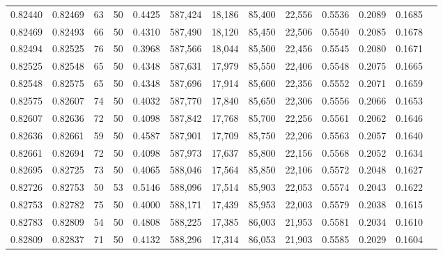 \begin{tabular}{rrrrrrrrrrrrr}
0.82440 & 0.82469 &    63 &  50 &                                     0.4425 & 587,424 &  18,186 &  85,400 &  22,556 & 0.5536 & 0.2089 & 0.1685 \\
0.82469 & 0.82493 &    66 &  50 &                                     0.4310 & 587,490 &  18,120 &  85,450 &  22,506 & 0.5540 & 0.2085 & 0.1678 \\
0.82494 & 0.82525 &    76 &  50 &                                     0.3968 & 587,566 &  18,044 &  85,500 &  22,456 & 0.5545 & 0.2080 & 0.1671 \\
0.82525 & 0.82548 &    65 &  50 &                                     0.4348 & 587,631 &  17,979 &  85,550 &  22,406 & 0.5548 & 0.2075 & 0.1665 \\
0.82548 & 0.82575 &    65 &  50 &                                     0.4348 & 587,696 &  17,914 &  85,600 &  22,356 & 0.5552 & 0.2071 & 0.1659 \\
0.82575 & 0.82607 &    74 &  50 &                                     0.4032 & 587,770 &  17,840 &  85,650 &  22,306 & 0.5556 & 0.2066 & 0.1653 \\
0.82607 & 0.82636 &    72 &  50 &                                     0.4098 & 587,842 &  17,768 &  85,700 &  22,256 & 0.5561 & 0.2062 & 0.1646 \\
0.82636 & 0.82661 &    59 &  50 &                                     0.4587 & 587,901 &  17,709 &  85,750 &  22,206 & 0.5563 & 0.2057 & 0.1640 \\
0.82661 & 0.82694 &    72 &  50 &                                     0.4098 & 587,973 &  17,637 &  85,800 &  22,156 & 0.5568 & 0.2052 & 0.1634 \\
0.82695 & 0.82725 &    73 &  50 &                                     0.4065 & 588,046 &  17,564 &  85,850 &  22,106 & 0.5572 & 0.2048 & 0.1627 \\
0.82726 & 0.82753 &    50 &  53 &                                     0.5146 & 588,096 &  17,514 &  85,903 &  22,053 & 0.5574 & 0.2043 & 0.1622 \\
0.82753 & 0.82782 &    75 &  50 &                                     0.4000 & 588,171 &  17,439 &  85,953 &  22,003 & 0.5579 & 0.2038 & 0.1615 \\
0.82783 & 0.82809 &    54 &  50 &                                     0.4808 & 588,225 &  17,385 &  86,003 &  21,953 & 0.5581 & 0.2034 & 0.1610 \\
0.82809 & 0.82837 &    71 &  50 &                                     0.4132 & 588,296 &  17,314 &  86,053 &  21,903 & 0.5585 & 0.2029 & 0.1604 \\

\end{tabular}
